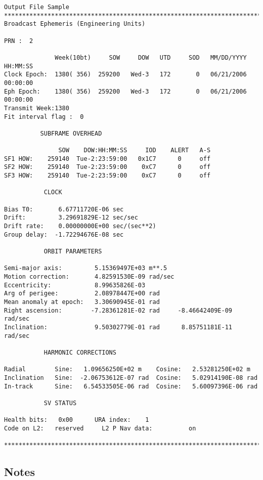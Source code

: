 \begin{Verbatim}
Output File Sample
****************************************************************************
Broadcast Ephemeris (Engineering Units)

PRN :  2

              Week(10bt)     SOW     DOW   UTD     SOD   MM/DD/YYYY   HH:MM:SS
Clock Epoch:  1380( 356)  259200   Wed-3   172       0   06/21/2006   00:00:00
Eph Epoch:    1380( 356)  259200   Wed-3   172       0   06/21/2006   00:00:00
Transmit Week:1380
Fit interval flag :  0

          SUBFRAME OVERHEAD

               SOW    DOW:HH:MM:SS     IOD    ALERT   A-S
SF1 HOW:    259140  Tue-2:23:59:00   0x1C7      0     off
SF2 HOW:    259140  Tue-2:23:59:00    0xC7      0     off
SF3 HOW:    259140  Tue-2:23:59:00    0xC7      0     off

           CLOCK

Bias T0:       6.67711720E-06 sec
Drift:         3.29691829E-12 sec/sec
Drift rate:    0.00000000E+00 sec/(sec**2)
Group delay:  -1.72294676E-08 sec

           ORBIT PARAMETERS

Semi-major axis:         5.15369497E+03 m**.5
Motion correction:       4.82591530E-09 rad/sec
Eccentricity:            8.99635826E-03
Arg of perigee:          2.08978447E+00 rad
Mean anomaly at epoch:   3.30690945E-01 rad
Right ascension:        -7.28361281E-02 rad     -8.46642409E-09 rad/sec
Inclination:             9.50302779E-01 rad      8.85751181E-11 rad/sec

           HARMONIC CORRECTIONS

Radial        Sine:   1.09656250E+02 m    Cosine:   2.53281250E+02 m
Inclination   Sine:  -2.06753612E-07 rad  Cosine:   5.02914190E-08 rad
In-track      Sine:   6.54533505E-06 rad  Cosine:   5.60097396E-06 rad

           SV STATUS

Health bits:   0x00      URA index:    1
Code on L2:   reserved     L2 P Nav data:          on

****************************************************************************
\end{Verbatim}
\subsection{Notes}

